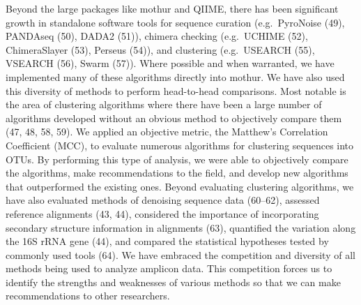 \documentclass[11pt,]{article}
\begin{document}
Beyond the large packages like mothur and QIIME, there has been
significant growth in standalone software tools for sequence curation
(e.g.~PyroNoise (49), PANDAseq (50), DADA2 (51)), chimera checking
(e.g.~UCHIME (52), ChimeraSlayer (53), Perseus (54)), and clustering
(e.g.~USEARCH (55), VSEARCH (56), Swarm (57)). Where possible and when
warranted, we have implemented many of these algorithms directly into
mothur. We have also used this diversity of methods to perform
head-to-head comparisons. Most notable is the area of clustering
algorithms where there have been a large number of algorithms developed
without an obvious method to objectively compare them (47, 48, 58, 59).
We applied an objective metric, the Matthew's Correlation Coefficient
(MCC), to evaluate numerous algorithms for clustering sequences into
OTUs. By performing this type of analysis, we were able to objectively
compare the algorithms, make recommendations to the field, and develop
new algorithms that outperformed the existing ones. Beyond evaluating
clustering algorithms, we have also evaluated methods of denoising
sequence data (60--62), assessed reference alignments (43, 44),
considered the importance of incorporating secondary structure
information in alignments (63), quantified the variation along the 16S
rRNA gene (44), and compared the statistical hypotheses tested by
commonly used tools (64). We have embraced the competition and diversity
of all methods being used to analyze amplicon data. This competition
forces us to identify the strengths and weaknesses of various methods so
that we can make recommendations to other researchers.
\end{document}
